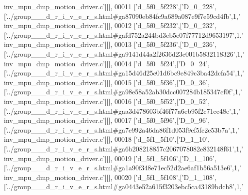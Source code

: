 \begin{DoxyCode}
{      inv\_mpu\_dmp\_motion\_driver.c'}]]],
00011   [\textcolor{stringliteral}{'d\_5f0\_5f228'},[\textcolor{stringliteral}{'D\_0\_228'},[\textcolor{stringliteral}{'../group\_\_\_d\_r\_i\_v\_e\_r\_s.html#ga87090eb84fc9a689a087e9f7e59cd4fb'},1,\textcolor{stringliteral}{'
      inv\_mpu\_dmp\_motion\_driver.c'}]]],
00012   [\textcolor{stringliteral}{'d\_5f0\_5f232'},[\textcolor{stringliteral}{'D\_0\_232'},[\textcolor{stringliteral}{'../group\_\_\_d\_r\_i\_v\_e\_r\_s.html#gafd752a244bd3eb5e07f77712d9653197'},1,\textcolor{stringliteral}{'
      inv\_mpu\_dmp\_motion\_driver.c'}]]],
00013   [\textcolor{stringliteral}{'d\_5f0\_5f236'},[\textcolor{stringliteral}{'D\_0\_236'},[\textcolor{stringliteral}{'../group\_\_\_d\_r\_i\_v\_e\_r\_s.html#ga9141d44a2f2636d23c001b5832118326'},1,\textcolor{stringliteral}{'
      inv\_mpu\_dmp\_motion\_driver.c'}]]],
00014   [\textcolor{stringliteral}{'d\_5f0\_5f24'},[\textcolor{stringliteral}{'D\_0\_24'},[\textcolor{stringliteral}{'../group\_\_\_d\_r\_i\_v\_e\_r\_s.html#ga15d46d25c01d6bc9c849c3ba42dcfa54'},1,\textcolor{stringliteral}{'
      inv\_mpu\_dmp\_motion\_driver.c'}]]],
00015   [\textcolor{stringliteral}{'d\_5f0\_5f36'},[\textcolor{stringliteral}{'D\_0\_36'},[\textcolor{stringliteral}{'../group\_\_\_d\_r\_i\_v\_e\_r\_s.html#ga98e58a52ab30dcc007284b185347cf0f'},1,\textcolor{stringliteral}{'
      inv\_mpu\_dmp\_motion\_driver.c'}]]],
00016   [\textcolor{stringliteral}{'d\_5f0\_5f52'},[\textcolor{stringliteral}{'D\_0\_52'},[\textcolor{stringliteral}{'../group\_\_\_d\_r\_i\_v\_e\_r\_s.html#gaa3d478603bf46f77a6eb95f2c71ee48e'},1,\textcolor{stringliteral}{'
      inv\_mpu\_dmp\_motion\_driver.c'}]]],
00017   [\textcolor{stringliteral}{'d\_5f0\_5f96'},[\textcolor{stringliteral}{'D\_0\_96'},[\textcolor{stringliteral}{'../group\_\_\_d\_r\_i\_v\_e\_r\_s.html#ga7e992a46da86f1d053f9ef5fc2e53b7a'},1,\textcolor{stringliteral}{'
      inv\_mpu\_dmp\_motion\_driver.c'}]]],
00018   [\textcolor{stringliteral}{'d\_5f1\_5f10'},[\textcolor{stringliteral}{'D\_1\_10'},[\textcolor{stringliteral}{'../group\_\_\_d\_r\_i\_v\_e\_r\_s.html#ga6b208218857c2067078082e832148f61'},1,\textcolor{stringliteral}{'
      inv\_mpu\_dmp\_motion\_driver.c'}]]],
00019   [\textcolor{stringliteral}{'d\_5f1\_5f106'},[\textcolor{stringliteral}{'D\_1\_106'},[\textcolor{stringliteral}{'../group\_\_\_d\_r\_i\_v\_e\_r\_s.html#ga1a90f348e71ec52d2ae6af1b56a513e6'},1,\textcolor{stringliteral}{'
      inv\_mpu\_dmp\_motion\_driver.c'}]]],
00020   [\textcolor{stringliteral}{'d\_5f1\_5f108'},[\textcolor{stringliteral}{'D\_1\_108'},[\textcolor{stringliteral}{'../group\_\_\_d\_r\_i\_v\_e\_r\_s.html#ga0443e52a615f3203ebc5ca43189bdcb8'},1,\textcolor{stringliteral}{'
}
\end{DoxyCode}
